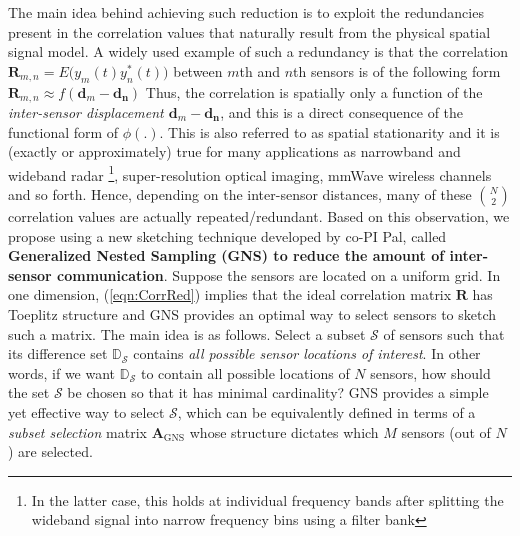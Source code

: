  The main idea behind achieving such reduction is to exploit the redundancies present in the correlation values that naturally result from the physical spatial signal model. A widely used example of such a redundancy is that the correlation $\mathbf{R}_{m,n} = E\Big(y_m(t)y^*_n(t)\Big)$ between $m$th and $n$th sensors is of the following form %
$\mathbf{R}_{m,n} \approx f(\mathbf{d}_m - \mathbf{d_n}) \label{eqn:CorrRed}$
Thus, the correlation is spatially only a function of the {\em inter-sensor displacement $\mathbf{d}_m - \mathbf{d_n}$}, and this is a direct consequence of the functional form of $\phi(.)$. This is also referred to as spatial stationarity and it is (exactly or approximately) true for many applications as narrowband and wideband radar \footnote{In the latter case, this holds at individual frequency bands after splitting the wideband signal into narrow frequency bins using a filter bank}, super-resolution optical imaging, mmWave wireless channels %
and so forth. Hence, depending on the inter-sensor distances, many of these $N\choose 2$ correlation values are actually repeated/redundant. Based on this observation, we propose using a new sketching technique developed by co-PI Pal, called {\bf Generalized Nested Sampling (GNS) to reduce the amount of inter-sensor communication}. Suppose the sensors are located on a uniform grid. In one dimension, (\ref{eqn:CorrRed}) implies that the ideal correlation matrix $\mathbf{R}$ has Toeplitz structure and GNS provides an optimal way to select sensors to sketch such a matrix. The main idea is as follows. Select a subset $\mathcal{S}$ of sensors such that its difference set $\mathbb{D}_{\mathcal{S}}$ contains {\em all possible sensor locations of interest}. In other words, if we want $\mathbb{D}_{\mathcal{S}}$ to contain all possible locations of $N$ sensors, how should the set $\mathcal{S}$ be chosen so that it has minimal cardinality? GNS provides a simple yet effective way to select $\mathcal{S}$, which can be equivalently defined in terms of a {\em subset selection} matrix $\mathbf{A}_{\text{GNS}}$ whose structure dictates which $M$ sensors (out of $N$) are selected. %

